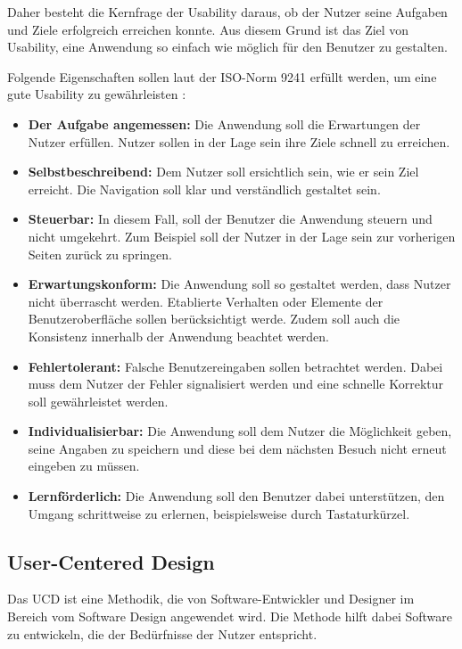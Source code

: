 Daher besteht die Kernfrage der Usability daraus, ob der Nutzer seine Aufgaben und Ziele erfolgreich erreichen konnte.
Aus diesem Grund ist das Ziel von Usability, eine Anwendung so einfach wie möglich für den Benutzer zu gestalten. \citep[vgl.]{jacobsen_praxisbuch_2019}

Folgende Eigenschaften sollen laut der ISO-Norm 9241 erfüllt werden, um eine gute Usability zu gewährleisten :

\begin{itemize}
	\item \textbf{Der Aufgabe angemessen:} Die Anwendung soll die Erwartungen der Nutzer erfüllen. Nutzer sollen in der Lage sein ihre Ziele schnell zu erreichen.
	\item \textbf{Selbstbeschreibend:} Dem Nutzer soll ersichtlich sein, wie er sein Ziel erreicht. Die Navigation soll klar und verständlich gestaltet sein.
	\item \textbf{Steuerbar:} In diesem Fall, soll der Benutzer die Anwendung steuern und nicht umgekehrt. Zum Beispiel soll der Nutzer in der Lage sein zur vorherigen Seiten zurück zu springen.
	\item \textbf{Erwartungskonform:} Die Anwendung soll so gestaltet werden, dass Nutzer nicht überrascht werden. Etablierte Verhalten oder Elemente der Benutzeroberfläche sollen berücksichtigt werde. Zudem soll auch die Konsistenz innerhalb der Anwendung beachtet werden.
	\item \textbf{Fehlertolerant:} Falsche Benutzereingaben sollen betrachtet werden. Dabei muss dem Nutzer der Fehler signalisiert werden und eine schnelle Korrektur soll gewährleistet werden.
	\item \textbf{Individualisierbar:} Die Anwendung soll dem Nutzer die Möglichkeit geben, seine Angaben zu speichern und diese bei dem nächsten Besuch nicht erneut eingeben zu müssen.
	\item \textbf{Lernförderlich:} Die Anwendung soll den Benutzer dabei unterstützen, den Umgang schrittweise zu erlernen, beispielsweise durch Tastaturkürzel.
\end{itemize}

\subsection{User-Centered Design}

Das \ac{UCD} ist eine Methodik, die von Software-Entwickler und Designer im Bereich vom Software Design angewendet wird. 
Die Methode hilft dabei Software zu entwickeln, die der Bedürfnisse der Nutzer entspricht. \cite[vgl.]{salinas_2020}

